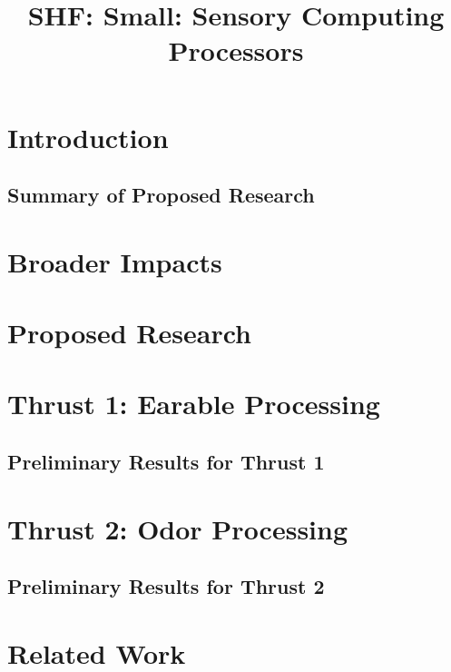 \documentclass[11 pt]{article}
\title{SHF: Small: Sensory Computing Processors}
\begin{document}
\maketitle
\section{Introduction}


\subsection{Summary of Proposed Research}
\label{ssec:summary}


\section{Broader Impacts}


\section{Proposed Research}


\section{Thrust 1: Earable Processing}
\label{sec:tract1}
\subsection{Preliminary Results for Thrust 1}
\label{ssec:prelim1}


\section{Thrust 2: Odor Processing}
\label{sec:tract2}
\subsection{Preliminary Results for Thrust 2}
\label{ssec:prelim2}


\section{Related Work}

\end{document}
